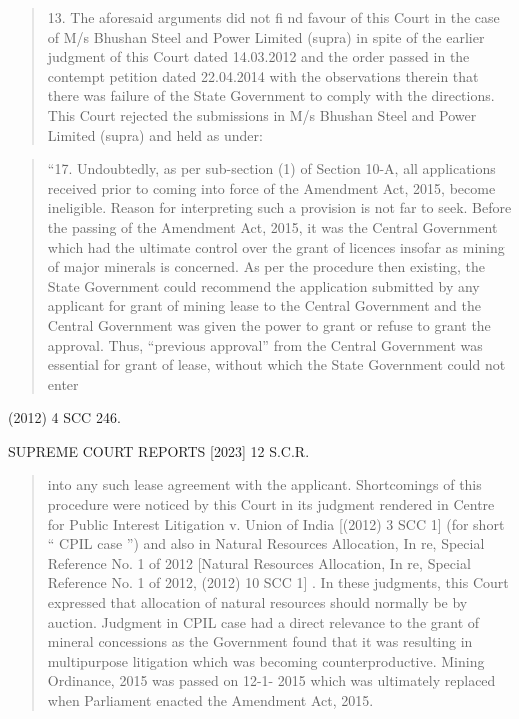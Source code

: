\documentclass[12pt,a4paper]{article}
\newenvironment{judgequote}
  {\begin{quote}\small}
  {\end{quote}}
\begin{document}
\begin{judgequote}
13. The aforesaid arguments did not fi nd favour of this Court in the
case of M/s Bhushan Steel and Power Limited (supra) in spite of the
earlier judgment of this Court dated 14.03.2012 and the order passed in the
contempt petition dated 22.04.2014 with the observations therein that there
was failure of the State Government to comply with the directions. This
Court rejected the submissions in M/s Bhushan Steel and Power Limited
(supra) and held as under:
\end{judgequote}

\begin{judgequote}
``17. Undoubtedly, as per sub-section (1) of Section 10-A, all
applications received prior to coming into force of the Amendment
Act, 2015, become ineligible. Reason for interpreting such a provision
is not far to seek. Before the passing of the Amendment Act, 2015, it
was the Central Government which had the ultimate control over the
grant of licences insofar as mining of major minerals is concerned.
As per the procedure then existing, the State Government could
recommend the application submitted by any applicant for grant of
mining lease to the Central Government and the Central Government
was given the power to grant or refuse to grant the approval. Thus,
``previous approval'' from the Central Government was essential for
grant of lease, without which the State Government could not enter
\end{judgequote}

 (2012) 4 SCC 246.




 SUPREME COURT REPORTS [2023] 12 S.C.R.


\begin{judgequote}
into any such lease agreement with the applicant. Shortcomings of
this procedure were noticed by this Court in its judgment rendered
in Centre for Public Interest Litigation v. Union of India [(2012) 3 SCC
1] (for short `` CPIL case '') and also in Natural Resources Allocation,
In re, Special Reference No. 1 of 2012 [Natural Resources Allocation,
In re, Special Reference No. 1 of 2012, (2012) 10 SCC 1] . In these
judgments, this Court expressed that allocation of natural resources
should normally be by auction. Judgment in CPIL case had a direct
relevance to the grant of mineral concessions as the Government found
that it was resulting in multipurpose litigation which was becoming
counterproductive. Mining Ordinance, 2015 was passed on 12-1-
2015 which was ultimately replaced when Parliament enacted the
Amendment Act, 2015.
\end{judgequote}
\end{document}
